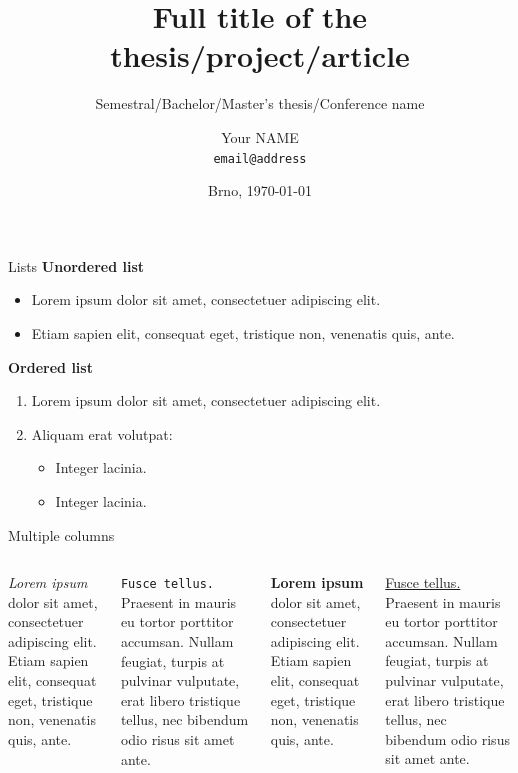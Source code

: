 \documentclass[aspectratio=1610]{beamer}
\title[Short title]
{Full title of the thesis/project/article}
\subtitle
{Semestral/Bachelor/Master's thesis/Conference name}
\author[Your NAME]
{
Your NAME\\
\texttt{email@address}}
\institute
{Department of Radio Electronics\\
Brno University of Technology, Czechia}
\date[\today]
{Brno, \today}
\begin{document}

\begin{frame}
    \titlepage
\end{frame}


\begin{frame}{Lists}
    \textbf{Unordered list}
    \begin{itemize}
        \item Lorem ipsum dolor sit amet, consectetuer adipiscing elit.

        \item Etiam sapien elit, consequat eget, tristique non, venenatis quis, ante.
    \end{itemize}
    \bigskip

    \textbf{Ordered list}
    \begin{enumerate}
        \item \alert{Lorem ipsum dolor} sit amet, consectetuer adipiscing elit.

        \item Aliquam erat volutpat:
        \begin{itemize}
            \item Integer lacinia.

            \item Integer lacinia.
        \end{itemize}
    \end{enumerate}
\end{frame}



\begin{frame}{Multiple columns}
    \begin{columns}
        \textit{Lorem ipsum} dolor sit amet, consectetuer adipiscing elit. Etiam sapien elit, consequat eget, tristique non, venenatis quis, ante.
        \bigskip
        
        \texttt{Fusce tellus.} Praesent in mauris eu tortor porttitor accumsan. Nullam feugiat, turpis at pulvinar vulputate, erat libero tristique tellus, nec bibendum odio risus sit amet ante.

        \textbf{Lorem ipsum} dolor sit amet, consectetuer adipiscing elit. Etiam sapien elit, consequat eget, tristique non, venenatis quis, ante.
        \bigskip
        
        \underline{Fusce tellus.} Praesent in mauris eu tortor porttitor accumsan. Nullam feugiat, turpis at pulvinar vulputate, erat libero tristique tellus, nec bibendum odio risus sit amet ante.
    \end{columns}
\end{frame}
\end{document}
